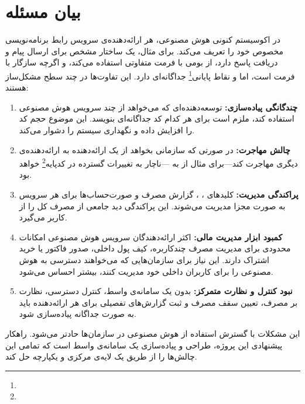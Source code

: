 \section{بیان مسئله}
\label{sec:problem}

در اکوسیستم کنونی هوش مصنوعی، هر ارائه‌دهنده‌ی سرویس رابط برنامه‌نویسی
مخصوص خود را تعریف می‌کند. برای مثال،  یک ساختار مشخص برای
ارسال پیام و دریافت پاسخ دارد،  از  بومی
 با فرمت متفاوتی استفاده می‌کند، و  اگرچه سازگار با
فرمت  است، اما  و نقاط پایانی\footnote{}
جداگانه‌ای دارد. این تفاوت‌ها در چند سطح مشکل‌ساز هستند:

\begin{enumerate}
  \item \textbf{چندگانگی پیاده‌سازی:}
    توسعه‌دهنده‌ای که می‌خواهد از چند سرویس هوش مصنوعی استفاده کند، ملزم
    است برای هر کدام کد جداگانه‌ای بنویسد. این موضوع حجم کد را افزایش داده
    و نگهداری سیستم را دشوار می‌کند.

  \item \textbf{چالش مهاجرت:}
    در صورتی که سازمانی بخواهد از یک ارائه‌دهنده به ارائه‌دهنده‌ی دیگری
    مهاجرت کند—برای مثال از  به —ناچار به تغییرات
    گسترده در کدپایه\footnote{} خواهد بود.

  \item \textbf{پراکندگی مدیریت:}
    کلیدهای ، ، گزارش مصرف و
    صورت‌حساب‌ها برای هر سرویس به صورت مجزا مدیریت می‌شوند. این پراکندگی
    دید جامعی از مصرف کل را از کاربر می‌گیرد.

  \item \textbf{کمبود ابزار مدیریت مالی:}
    اکثر ارائه‌دهندگان سرویس هوش مصنوعی امکانات محدودی برای مدیریت
    مصرف چندکاربره، کیف پول داخلی، صدور فاکتور یا خرید اشتراک دارند.
    این نیاز برای سازمان‌هایی که می‌خواهند دسترسی به هوش مصنوعی را
    برای کاربران داخلی خود مدیریت کنند، بیشتر احساس می‌شود.

  \item \textbf{نبود کنترل و نظارت متمرکز:}
    بدون یک سامانه‌ی واسط، کنترل دسترسی، نظارت بر مصرف، تعیین سقف
    مصرف و ثبت گزارش‌های تفصیلی برای هر ارائه‌دهنده باید به صورت جداگانه
    پیاده‌سازی شود.
\end{enumerate}

این مشکلات با گسترش استفاده از هوش مصنوعی در سازمان‌ها حادتر می‌شود.
راهکار پیشنهادی این پروژه، طراحی و پیاده‌سازی یک سامانه‌ی واسط است که
تمامی این چالش‌ها را از طریق یک لایه‌ی مرکزی و یکپارچه حل کند.

